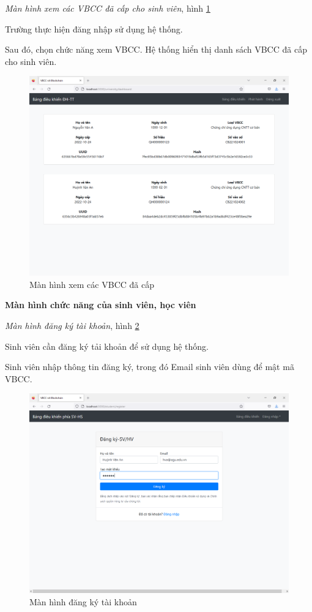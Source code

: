 \emph{Màn hình xem các VBCC đã cấp cho sinh viên}, hình \ref{fig:tt_dacap}

Trường thực hiện đăng nhập sử dụng hệ thống.

Sau đó, chọn chức năng xem VBCC. Hệ thống hiển thị danh sách VBCC đã cấp cho sinh viên.

\begin{figure}[H]
\centering
\includegraphics[width=.9\linewidth]{img/tt_dacap.PNG}
\caption{Màn hình xem các VBCC đã cấp}
\label{fig:tt_dacap}
\end{figure}


\textbf{Màn hình chức năng của sinh viên, học viên}

\emph{Màn hình đăng ký tài khoản}, hình \ref{fig:std_new}

Sinh viên cần đăng ký tải khoản để sử dụng hệ thống.

Sinh viên nhập thông tin đăng ký, trong đó Email sinh viên dùng để mật mã VBCC.

\begin{figure}[H]
\centering
\includegraphics[width=.9\linewidth]{img/std_new.PNG}
\caption{Màn hình đăng ký tài khoản}
\label{fig:std_new}
\end{figure}

